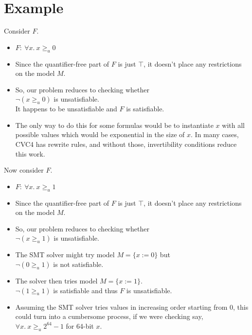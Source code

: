 \documentclass{article}
\begin{document}
\section{Example}
	Consider $F$.
	\begin{itemize}
		\item $F :\ \forall x.\ x \ge_u 0$
		\item Since the quantifier-free part of 
		$F$ is just $\top$, it doesn't place any 
		restrictions on the model $M$. 
		\item So, our problem reduces to checking whether\\
		$\neg (x \ge_u 0)$ is unsatisfiable.\\
		It happens to be unsatisfiable and $F$ 
		is satisfiable.
		\item The only way to do this for some formulas
		would be to instantiate $x$ with all possible
		values which would be exponential in the size 
		of $x$. In many cases, CVC4 has rewrite rules, 
		and without those, invertibility conditions 
		reduce this work.
	\end{itemize}
	Now consider $F$.
	\begin{itemize}
		\item $F :\ \forall x.\ x \ge_u 1$
		\item Since the quantifier-free part of 
		$F$ is just $\top$, it doesn't place any 
		restrictions on the model $M$. 
		\item So, our problem reduces to checking whether\\
		$\neg (x \ge_u 1)$ is unsatisfiable.
		\item The SMT solver might try model 
		$M = \{x := 0\}$ but \\
		$\neg (0 \ge_u 1)$ is not satisfiable.
		\item The solver then tries model 
		$M = \{x := 1\}$.\\
		$\neg (1 \ge_u 1)$ is satisfiable
		and thus $F$ is unsatisfiable.
		\item Assuming the SMT solver tries values 
		in increasing order starting from $0$, this 
		could turn into a cumbersome process, if we were
		checking say, $\forall x.\ x \ge_u 2^{64}-1$ for
		64-bit $x$.
\end{itemize}
\end{document}
